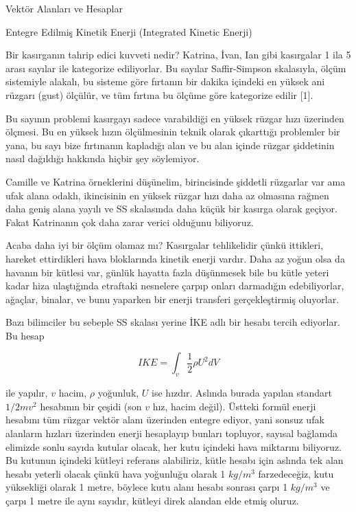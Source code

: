 \documentclass[12pt,fleqn]{article}\usepackage{../../common}
\begin{document}
Vektör Alanları ve Hesaplar

Entegre Edilmiş Kinetik Enerji (Integrated Kinetic Enerji)

Bir kasırganın tahrip edici kuvveti nedir? Katrina, İvan, Ian gibi kasırgalar 1
ila 5 arası sayılar ile kategorize ediliyorlar. Bu sayılar Saffir-Simpson
skalasıyla, ölçüm sistemiyle alakalı, bu sisteme göre fırtanın bir dakika
içindeki en yüksek ani rüzgarı (gust) ölçülür, ve tüm fırtına bu ölçüme göre
kategorize edilir [1].

Bu sayının problemi kasırgayı sadece varabildiği en yüksek rüzgar hızı üzerinden
ölçmesi. Bu en yüksek hızın ölçülmesinin teknik olarak çıkarttığı problemler bir
yana, bu sayı bize fırtınanın kapladığı alan ve bu alan içinde rüzgar şiddetinin
nasıl dağıldığı hakkında hiçbir şey söylemiyor.

Camille ve Katrina örneklerini düşünelim, birincisinde şiddetli rüzgarlar var
ama ufak alana odaklı, ikincisinin en yüksek rüzgar hızı daha az olmasına rağmen
daha geniş alana yayılı ve SS skalasında daha küçük bir kasırga olarak geçiyor.
Fakat Katrinanın çok daha zarar verici olduğunu biliyoruz.

Acaba daha iyi bir ölçüm olamaz mı? Kasırgalar tehlikelidir çünkü ittikleri,
hareket ettirdikleri hava bloklarında kinetik enerji vardır. Daha az yoğun olsa
da havanın bir kütlesi var, günlük hayatta fazla düşünmesek bile bu kütle yeteri
kadar hiza ulaştığında etraftaki nesnelere çarpıp onları darmadığın
edebiliyorlar, ağaçlar, binalar, ve bunu yaparken bir enerji transferi
gerçekleştirmiş oluyorlar.

Bazı bilimciler bu sebeple SS skalası yerine İKE adlı bir hesabı tercih
ediyorlar. Bu hesap

$$
IKE = \int_v \frac{1}{2} \rho U^2 dV
$$

ile yapılır, $v$ hacim, $\rho$ yoğunluk, $U$ ise hızdır. Aslında burada yapılan
standart $1/2 m v^2$ hesabının bir çeşidi (son $v$ hız, hacim değil). Üstteki
formül enerji hesabını tüm rüzgar vektör alanı üzerinden entegre ediyor, yani
sonsuz ufak alanların hızları üzerinden enerji hesaplayıp bunları topluyor,
sayısal bağlamda elimizde sonlu sayıda kutular olacak, her kutu içindeki hava
miktarını biliyoruz. Bu kutunun içindeki kütleyi referans alabiliriz, kütle
hesabı için aslında tek alan hesabı yeterli olacak çünkü hava yoğunluğu olarak 1
$kg/m^3$ farzedeceğiz, kutu yüksekliği olarak 1 metre, böylece kutu alanı hesabı
sonrası çarpı 1 $kg/m^3$ ve çarpı 1 metre ile aynı sayıdır, kütleyi direk
alandan elde etmiş oluruz.
\end{document}
